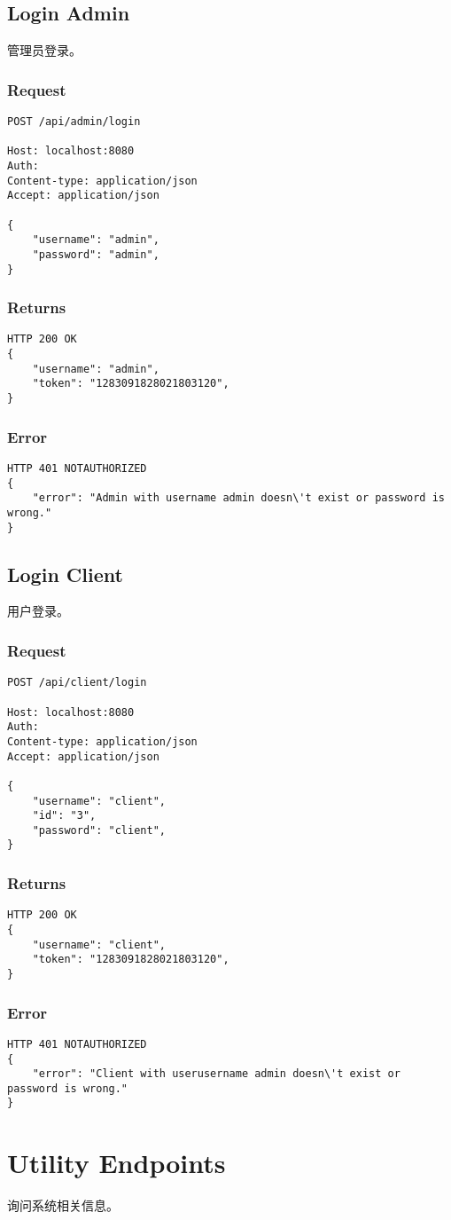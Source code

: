 \documentclass{article}
\begin{document}
\subsection{Login Admin}
管理员登录。

\subsubsection*{Request}
\begin{lstlisting}
POST /api/admin/login

Host: localhost:8080
Auth:
Content-type: application/json
Accept: application/json

{
    "username": "admin",
    "password": "admin",
}
\end{lstlisting}

\subsubsection*{Returns}
\begin{lstlisting}
HTTP 200 OK
{
    "username": "admin",
    "token": "1283091828021803120",
}

\end{lstlisting}

\subsubsection*{Error}
\begin{lstlisting}
HTTP 401 NOTAUTHORIZED
{
    "error": "Admin with username admin doesn\'t exist or password is wrong."
}
\end{lstlisting}

\subsection{Login Client}
用户登录。

\subsubsection*{Request}
\begin{lstlisting}
POST /api/client/login

Host: localhost:8080
Auth:
Content-type: application/json
Accept: application/json

{
    "username": "client",
    "id": "3",
    "password": "client",
}
\end{lstlisting}

\subsubsection*{Returns}
\begin{lstlisting}
HTTP 200 OK
{
    "username": "client",
    "token": "1283091828021803120",
}

\end{lstlisting}

\subsubsection*{Error}
\begin{lstlisting}
HTTP 401 NOTAUTHORIZED
{
    "error": "Client with userusername admin doesn\'t exist or password is wrong."
}
\end{lstlisting}

\section{Utility Endpoints}
询问系统相关信息。
\end{document}
